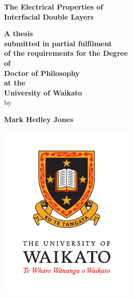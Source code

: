 
\begin{titlepage}
\begin{center}
\textbf{\LARGE The Electrical Properties of}\\
\textbf{\LARGE{} \medskip{}
Interfacial Double Layers}
\par\end{center}{\LARGE \par}
\begin{center}
\vspace{1cm}

\par\end{center}

\begin{center}
\textbf{\medskip{}
A thesis}\\
\textbf{ \medskip{}
submitted in partial fulfilment}\\
\textbf{ \medskip{}
of the requirements for the Degree}\\
\textbf{ \medskip{}
of}\\
\textbf{ \medskip{}
Doctor of Philosophy}\\
\textbf{ \medskip{}
at the}\\
\textbf{ \medskip{}
University of Waikato}\\
\textbf{ \medskip{}
} by \vspace{1cm}

\par\end{center}

\begin{center}
\textbf{\large Mark Hedley Jones}
\par\end{center}{\large \par}

\begin{center}
\vspace{40pt}

\par\end{center}

\begin{center}
\includegraphics{Waik-Print-PMS-V}
\par\end{center}


\end{titlepage}
